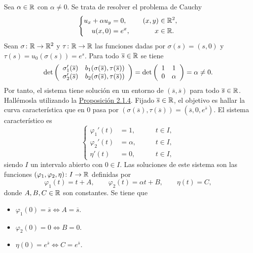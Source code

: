 \documentclass[a4paper, 12pt, extrafontsizes]{memoir}
\begin{document}
\begin{example}
    Sea $\alpha \in \mathbb R$ con $\alpha \neq 0$. Se trata de resolver el problema de Cauchy
    \[
    \left\{\begin{alignedat}{3}
        u_x+\alpha u_y &= 0, \qquad & (x,y) &\in \mathbb R^2, \\
        u(x,0) &= e^x, \qquad & x &\in \mathbb R.
    \end{alignedat}\right.
    \]
    Sean $\sigma \colon \mathbb R \to \mathbb R^2$ y $\tau \colon \mathbb R \to \mathbb R$ las funciones dadas por $\sigma(s) = (s,0)$ y $\tau(s)=u_0(\sigma(s)) = e^s$. Para todo $\overline{s} \in \mathbb R$ se tiene
    \[\textup{det}\left(
        \begin{array}{cc}
            \sigma_1'(\overline{s}) & b_1(\sigma(\overline{s}),\tau(\overline{s})) \\
            \sigma_2'(\overline{s}) & b_2(\sigma(\overline{s}),\tau(\overline{s}))
        \end{array}
    \right) = \textup{det}\left(
        \begin{array}{cc}
            1 & 1 \\
            0 & \alpha
        \end{array}
    \right) = \alpha \neq 0.\]
    Por tanto, el sistema tiene solución en un entorno de $(\overline{s},\overline{s})$ para todo $\overline{s} \in \mathbb R$. Hallémosla utilizando la \hyperref[pro:2.1.4]{\color{gray}Proposición 2.1.4}. Fijado $\overline{s} \in \mathbb R$, el objetivo es hallar la curva característica que en $0$ pasa por $(\sigma(\overline{s}),\tau(\overline{s})) = (\overline{s},0,e^{\overline{s}})$. El sistema característico es
    \[
    \left\{\begin{alignedat}{2}
        \varphi_1'(t) &= 1, \qquad & t \in I, \\
        \varphi_2'(t) &= \alpha, \qquad & t \in I, \\
        \eta'(t) &= 0, \qquad & t \in I,
    \end{alignedat}\right.
    \]
    siendo $I$ un intervalo abierto con $0 \in I$. Las soluciones de este sistema son las funciones $(\varphi_1,\varphi_2,\eta) \colon I \to \mathbb R$ definidas por
    \[\varphi_1(t) = t+A, \qquad \varphi_2(t) = \alpha t+B, \qquad \eta(t) = C,\]
    donde $A,B,C \in \mathbb R$ son constantes. Se tiene que
    \begin{itemize}
        \item $\varphi_1(0)=\overline{s} \iff A = \overline{s}$.
        \item $\varphi_2(0)=0 \iff B = 0$.
        \item $\eta(0)=e^{\overline{s}} \iff C = e^{\overline{s}}$.

\end{itemize}
\end{example}
\end{document}
